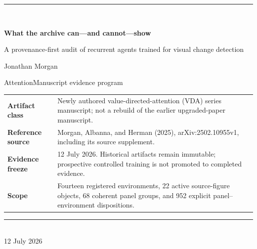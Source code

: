 \documentclass[11pt,a4paper]{article}
\begin{document}
\begin{titlepage}
\thispagestyle{empty}
\vspace*{18mm}
{\color{VdaBlue}\rule{\textwidth}{2.2pt}}\\[10mm]
{\fontsize{28}{33}\selectfont\bfseries What the archive can---and cannot---show\par}
\vspace{5mm}
{\fontsize{17}{22}\selectfont A provenance-first audit of recurrent agents trained for visual change detection\par}
\vspace{16mm}
{\large Jonathan Morgan\par}
\vspace{2mm}
{\normalsize AttentionManuscript evidence program\par}
\vfill
\begin{tabularx}{\textwidth}{@{}lY@{}}
\toprule
\textbf{Artifact class} & Newly authored value-directed-attention (VDA) series manuscript; not a rebuild of the earlier upgraded-paper manuscript.\\
\textbf{Reference source} & Morgan, Albanna, and Herman (2025), arXiv:2502.10955v1, including its source supplement.\\
\textbf{Evidence freeze} & 12 July 2026. Historical artifacts remain immutable; prospective controlled training is not promoted to completed evidence.\\
\textbf{Scope} & Fourteen registered environments, 22 active source-figure objects, 68 coherent panel groups, and 952 explicit panel--environment dispositions.\\
\bottomrule
\end{tabularx}
\vfill
{\color{VdaBlue}\rule{\textwidth}{2.2pt}}\\[3mm]
{\small 12 July 2026}
\end{titlepage}

\begin{abstract}
A spatial cue can make an agent report ``change'' more often because discrimination improves or because the decision criterion becomes more liberal. Response curves alone cannot separate those explanations. This audit asks which behavioral, representational, and model-intervention claims survive when every result is tied to an explicit task, checkpoint, and evidence class. It separates deterministic task specifications, documentation of the inspected implementation, historical aggregate records, and new checkpoint recomputations. The matched battery compares five pairs of separately trained agents with either 128 or 256 recurrent coordinates at each spatial location. Their behavioral, readout, and intervention differences change direction across pairs; there is no consistent wider-is-better pattern. Held-out probes can read whether a change occurred and, where defined, its location at the final timestep. A direct bias to cue-related routing keys changes sensitivity within individual checkpoints. Because the paired checkpoints were trained separately and response criterion is not analyzed here, these results do not estimate a causal width effect, population or seed variation, human capacity, or biological mechanism.
\end{abstract}
\end{document}

